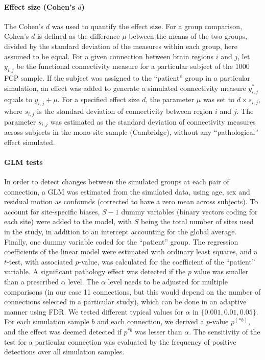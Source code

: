 \documentclass[authoryear]{elsarticle}
\begin{document}
\paragraph{Effect size (Cohen's $d$)}
The Cohen's $d$ was used to quantify the effect size. For a group comparison, Cohen's $d$ is defined as the difference $\mu$ between the means of the two groups, divided by the standard deviation of the measures within each group, here assumed to be equal. For a given connection between brain regions $i$ and $j$, let $y_{i,j}$ be the functional connectivity measure for a particular subject of the 1000 FCP sample. If the subject was assigned to the ``patient'' group in a particular simulation, an effect was added to generate a simulated connectivity measure $y_{i,j}^*$ equals to $y_{i,j} + \mu$. For a specified effect size $d$, the parameter $\mu$ was set to $d\times s_{i,j}$, where $s_{i,j}$ is the standard deviation of connectivity between region $i$ and $j$. The parameter $s_{i,j}$ was estimated as the standard deviation of connectivity measures across subjects in the mono-site sample (Cambridge), without any ``pathological'' effect simulated.

\paragraph{GLM tests}
In order to detect changes between the simulated groups at each pair of connection, a GLM was estimated from the simulated data, using age, sex and residual motion as confounds (corrected to have a zero mean across subjects). To account for site-specific biases, $S-1$ dummy variables (binary vectors coding for each site) were added to the model, with $S$ being the total number of sites used in the study, in addition to an intercept accounting for the global average. Finally, one dummy variable coded for the ``patient'' group. The regression coefficients of the linear model were estimated with ordinary least squares, and a $t$-test, with associated $p$-value, was calculated for the coefficient of the ``patient'' variable. A significant pathology effect was detected if the $p$ value was smaller than a prescribed $\alpha$ level. The $\alpha$ level needs to be adjusted for multiple comparisons (in our case 11 connections, but this would depend on the number of connections selected in a particular study), which can be done in an adaptive manner using FDR. We tested different typical values for $\alpha$ in $\{0.001,0.01,0.05\}$. For each simulation sample $b$ and each connection, we derived a $p$-value $p^{(*b)}$, and the effect was deemed detected if $p^{*b}$ was lesser than $\alpha$. The sensitivity of the test for a particular connection was evaluated by the frequency of positive detections over all simulation samples.
\end{document}
